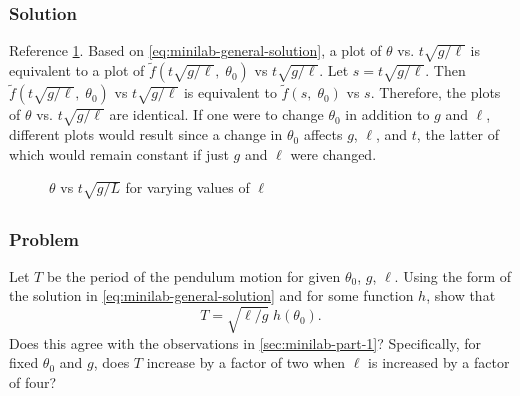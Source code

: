 \documentclass[12pt]{article}
\begin{document}
  \subsubsection*{Solution}
  Reference \cref{fig:minilab-part-2-solution}. Based on
  \cref{eq:minilab-general-solution}, a plot of $\theta$ vs. $t\sqrt{g/\ell}$ is
  equivalent to a plot of $\tilde{f}(t\sqrt{g/\ell}, \;\theta_0)$ vs
  $t\sqrt{g/\ell}$. Let $s = t\sqrt{g/\ell}$. Then $\tilde{f}(t\sqrt{g/\ell},
  \;\theta_0)$ vs $t\sqrt{g/\ell}$ is equivalent to $\tilde{f}(s, \;\theta_0)$
  vs $s$. Therefore, the plots of $\theta$ vs. $t\sqrt{g/\ell}$ are identical.
  If one were to change $\theta_0$ in addition to $g$ and $\ell$, different
  plots would result since a change in $\theta_0$ affects $g$, $\ell$, and $t$,
  the latter of which would remain constant if just $g$ and $\ell$ were changed.
  \begin{figure}
    \centering
    \caption{$\theta$ vs $t\sqrt{g/L}$ for varying values of $\ell$}
\label{fig:minilab-part-2-solution}
  \end{figure}

\subsection{}
  \subsubsection*{Problem}
  Let $T$ be the period of the pendulum motion for given $\theta_0$, $g$,
  $\ell$. Using the form of the solution in \cref{eq:minilab-general-solution}
  and for some function $h$, show that
  \begin{equation}
    \label{eq:2-3-prob}
    T=\sqrt{\ell/g}\;h(\theta_0).
  \end{equation}
  Does this agree with the observations in \cref{sec:minilab-part-1}?
  Specifically, for fixed $\theta_0$ and $g$, does $T$ increase by a factor of
  two when $\ell$ is increased by a factor of four?
\end{document}

